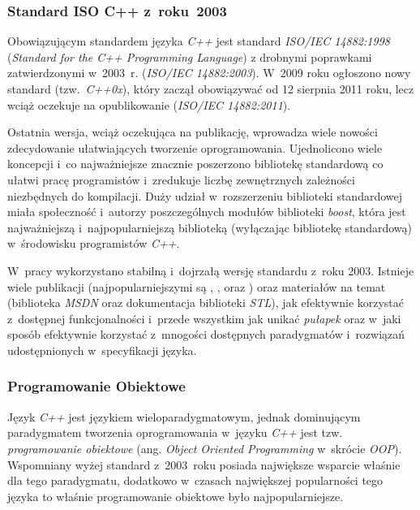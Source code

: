       \subsubsection{Standard ISO C++ z~roku~2003}

        Obowiązującym standardem języka \textit{C++} jest standard \textit{ISO/IEC 14882:1998} (\textit{Standard for the C++ Programming Language}) z drobnymi poprawkami zatwierdzonymi w~2003~r. (\textit{ISO/IEC 14882:2003}). W~2009 roku ogłoszono nowy standard (tzw.~\textit{C++0x}), który zaczął obowiązywać od 12 sierpnia 2011 roku, lecz wciąż oczekuje na opublikowanie (\textit{ISO/IEC 14882:2011}).

        Ostatnia wersja, wciąż oczekująca na publikację, wprowadza wiele nowości zdecydowanie ułatwiających tworzenie oprogramowania. Ujednolicono wiele koncepcji i~co najważniejsze znacznie poszerzono bibliotekę standardową co ułatwi pracę programistów i~zredukuje liczbę zewnętrznych zależności niezbędnych do kompilacji. Duży udział w~rozszerzeniu biblioteki standardowej miała społeczność i~autorzy poszczególnych modułów biblioteki \textit{boost}, która jest najważniejszą i~najpopularniejszą biblioteką (wyłączając bibliotekę standardową) w~środowisku programistów \textit{C++}.

        W~pracy wykorzystano stabilną i~dojrzałą wersję standardu z~roku 2003. Istnieje wiele publikacji (najpopularniejszymi są \cite{EffectiveCpp}, \cite{MoreEffectiveCpp}, \cite{EffectiveStl} oraz \cite{Alexandrescu}) oraz materiałów na temat (biblioteka \textit{MSDN} oraz dokumentacja biblioteki \textit{STL}), jak efektywnie korzystać z~dostępnej funkcjonalności i~przede wszystkim jak unikać \textit{pułapek} oraz w~jaki sposób efektywnie korzystać z~mnogości dostępnych paradygmatów i~rozwiązań udostępnionych w~specyfikacji języka.

      \subsubsection{Programowanie Obiektowe}

        Język \textit{C++} jest językiem wieloparadygmatowym, jednak dominującym paradygmatem tworzenia oprogramowania w~języku \textit{C++} jest tzw. \textit{programowanie obiektowe} (ang. \textit{Object Oriented Programming} w~skrócie \textit{OOP}). Wspomniany wyżej standard z~2003~roku posiada największe wsparcie właśnie dla tego paradygmatu, dodatkowo w~czasach największej popularności tego języka to właśnie programowanie obiektowe było najpopularniejsze.

